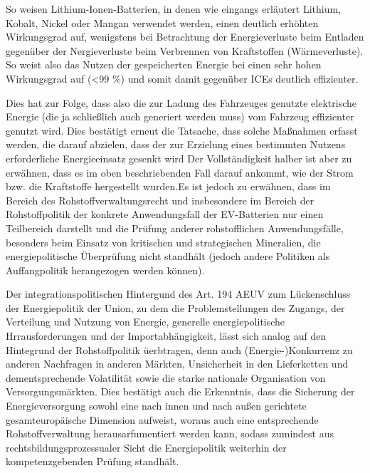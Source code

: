 \documentclass[12pt,a4paper,oneside]{book} %
\begin{document}
So weisen Lithium-Ionen-Batterien, in denen wie eingangs erläutert Lithium, Kobalt, Nickel oder Mangan verwendet werden, einen deutlich erhöhten Wirkungsgrad auf, wenigstens bei Betrachtung der Energieverluste beim Entladen gegenüber der Nergieverluste beim Verbrennen von Kraftstoffen (Wärmeverluste). So weist also das Nutzen der gespeicherten Energie bei einen sehr hohen Wirkungsgrad auf (<99 \%) und somit damit gegenüber ICEs deutlich effizienter.%

Dies hat zur Folge, dass also die zur Ladung des Fahrzeuges genutzte elektrische Energie (die ja schließlich auch generiert werden muss) vom Fahrzeug effizienter genutzt wird. Dies bestätigt erneut die Tatsache, dass solche Maßnahmen erfasst werden, die \glqq darauf abzielen, dass der zur Erzielung eines bestimmten Nutzens erforderliche Energieeinsatz gesenkt wird\grqq\autocite{Nettesheim in Grabitz/Hilf, AEUV Art. 194, Rn. 17}
Der Vollständigkeit halber ist aber zu erwähnen, dass es im oben beschriebenden Fall darauf ankommt, wie der Strom bzw. die Kraftstoffe hergestellt wurden.Es ist jedoch zu erwähnen, dass im Bereich des Rohstoffverwaltungsrecht und insbesondere im Bereich der Rohstoffpolitik der konkrete Anwendungsfall der EV-Batterien nur einen Teilbereich darstellt und die Prüfung anderer rohstofflichen Anwendungsfälle, besonders beim Einsatz von kritischen und strategischen Mineralien, die energiepolitische Überprüfung nicht standhält (jedoch andere Politiken als Auffangpolitik herangezogen werden können).
	
Der integrationspolitischen Hintergund des Art. 194 AEUV zum Lückenschluss der Energiepolitik der Union, zu dem die Problemstellungen des Zugangs, der Verteilung und Nutzung von Energie, generelle energiepolitische Hrrausforderungen und der Importabhängigkeit,\autocite[Nettesheim, Art. 194 Rn 10]{grabitz_recht_2024} lässt sich analog auf den Hintegrund der Rohstoffpolitik üerbtragen, denn auch (Energie-)Konkurrenz zu anderen Nachfragen in anderen Märkten, Unsicherheit in den Lieferketten und dementsprechende Volatilität sowie die starke nationale Organisation von Versorgungsmärkten.\autocite[Nettesheim, Art. 194 Rn 10]{grabitz_recht_2024} Dies bestätigt auch die Erkenntnis, dass die Sicherung der Energieversorgung sowohl eine nach innen und nach außen gerichtete gesamteuropäische Dimension aufweist, woraus auch eine entsprechende Rohstoffverwaltung herausarfumentiert werden kann, sodass zumindest aus rechtsbildungsprozessualer Sicht die Energiepolitik weiterhin der kompetenzgebenden Prüfung standhält.
	
\end{document}
